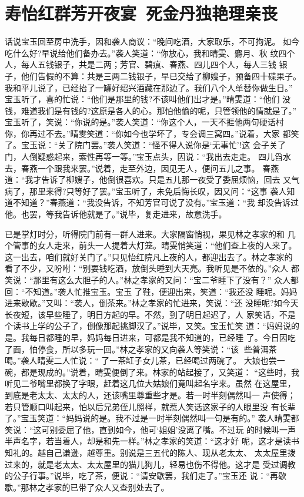 \chapter{寿怡红群芳开夜宴~死金丹独艳理亲丧}

话说宝玉回至房中洗手，因和袭人商议：“晚间吃酒，大家取乐，不可拘泥。
如今吃什么好?早说给他们备办去。”袭人笑道：“你放心，我和晴雯、麝月、秋
纹四个人，每人五钱银子，共是二两；芳官、碧痕、春燕、四儿四个人，每人三钱
银子，他们告假的不算：共是三两二钱银子，早已交给了柳嫂子，预备四十碟果子。
我和平儿说了，已经抬了一罐好绍兴酒藏在那边了。我们八个人单替你做生日。”
宝玉听了，喜的忙说：“他们是那里的钱?不该叫他们出才是。”晴雯道：“他们
没钱，难道我们是有钱的?这原是各人的心。那怕他偷的呢，只管领他的情就是了。”
宝玉听了，笑说：“你说的是。”袭人笑道：“你这个人，一天不捱他两句硬话村
你，你再过不去。”晴雯笑道：“你如今也学坏了，专会调三窝四。”说着，大家
都笑了。宝玉说：“关了院门罢。”袭人笑道：“怪不得人说你是‘无事忙’!这
会子关了门，人倒疑惑起来，索性再等一等。”宝玉点头，因说：“我出去走走。
四儿舀水去，春燕一个跟我来罢。”说着，走至外边，因见无人，便问五儿之事。
春燕道：“我才告诉了柳嫂子，他倒很喜欢。只是五儿那一夜受了委屈烦恼，回去
又气病了，那里来得?只等好了罢。”宝玉听了，未免后悔长叹，因又问：“这事
袭人知道不知道？”春燕道：“我没告诉，不知芳官可说了没有。”宝玉道：“我
却没告诉过他。也罢，等我告诉他就是了。”说毕，复走进来，故意洗手。

已是掌灯时分，听得院门前有一群人进来。大家隔窗悄视，果见林之孝家的和
几个管事的女人走来，前头一人提着大灯笼。晴雯悄笑道：“他们查上夜的人来了。
这一出去，咱们就好关门了。”只见怡红院凡上夜的人，都迎出去了。林之孝家的
看了不少，又吩咐：“别耍钱吃酒，放倒头睡到大天亮。我听见是不依的。”众人
都笑说：“那里有这么大胆子的人。”林之孝家的又问：“宝二爷睡下了没有？”
众人都回：“不知道。”袭人忙推宝玉。宝玉了鞋，便迎出来，笑道：“我还没
睡呢。妈妈进来歇歇。”又叫：“袭人，倒茶来。”林之孝家的忙进来，笑说：“还
没睡呢?如今天长夜短，该早些睡了，明日方起的早。不然，到了明日起迟了，人
家笑话，不是个读书上学的公子了，倒像那起挑脚汉了。”说毕，又笑。宝玉忙笑
道：“妈妈说的是。我每日都睡的早，妈妈每日进来，可都是我不知道的，已经睡
了。今日因吃了面，怕停食，所以多玩一回。”林之孝家的又向袭人等笑说：“该
些普洱茶喝。”袭人晴雯二人忙说：“了一茶缸子女儿茶，已经喝过两碗了。
大娘也尝一碗，都是现成的。”说着，晴雯便倒了来。林家的站起接了，又笑道：
“这些时，我听见二爷嘴里都换了字眼，赶着这几位大姑娘们竟叫起名字来。虽然
在这屋里，到底是老太太、太太的人，还该嘴里尊重些才是。若一时半刻偶然叫一
声使得；若只管顺口叫起来，怕以后兄弟侄儿照样，就惹人笑话这家子的人眼里没
有长辈了。”宝玉笑道：“妈妈说的是。我不过是一时半刻偶然叫一句是有的。”
袭人晴雯都笑说：“这可别委屈了他，直到如今，他可‘姐姐’没离了嘴。不过玩
的时候叫一声半声名字，若当着人，却是和先一样。”林之孝家的笑道：“这才好
呢，这才是读书知礼的。越自己谦逊，越尊重。别说是三五代的陈人、现从老太太、
太太屋里拨过来的，就是老太太、太太屋里的猫儿狗儿，轻易也伤不得他。这才是
受过调教的公子行事。”说毕，吃了茶，便说：“请安歇罢，我们走了。”宝玉还
说：“再歇歇。”那林之孝家的已带了众人又查别处去了。

